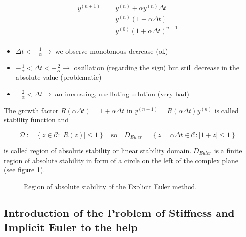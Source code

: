 \[
\begin{aligned}
y^{(n+1)} &= y^{(n)} + \alpha y^{(n)} \Delta t \\
&= y^{(n)}(1 + \alpha \Delta t)\\
&= y^{(0)}(1 + \alpha \Delta t)^{n + 1}\\
\end{aligned}
\]

\begin{itemize}
\item $\Delta t < -\frac{1}{\alpha}  \rightarrow$ we observe monotonous decrease (ok)
\item $-\frac{1}{\alpha} < \Delta t < -\frac{2}{\alpha} \rightarrow $ oscillation (regarding the sign) but still decrease in the absolute value (problematic)
\item $-\frac{2}{\alpha} < \Delta t \rightarrow $ an increasing, oscillating solution (very bad)
\end{itemize}

The growth factor $R(\alpha \Delta t) = 1 + \alpha \Delta t$ in $y^{(n + 1)} = R(\alpha \Delta t) y^{(n)}$ is called stability function and

\[
\mathcal{D}:=\left\{ z \in \mathcal{C}: |R(z)| \le 1\right\} \quad\mathrm{so}\quad D_{Euler}=\left\{ z = \alpha \Delta t \in \mathcal{C}: |1 + z| \le 1\right\}
\]

is called region of absolute stability or linear stability domain. $D_{Euler}$ is a finite region of absolute stability in form of a circle on the left of the complex plane (see figure \ref{fig:expl_euler_stab_reg}).

\begin{figure}[!htb]
  \centering
  \hfill
  \caption{Region of absolute stability of the Explicit Euler method.}
  \label{fig:expl_euler_stab_reg}
\end{figure}



\subsection{Introduction of the Problem of Stiffness and Implicit Euler to the help}
